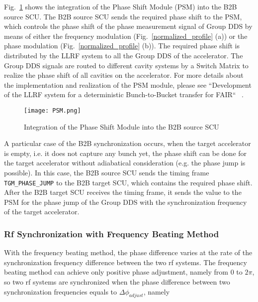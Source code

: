 Fig.~\ref{PSM} shows the integration of the Phase Shift Module (PSM) into the B2B source SCU. The B2B source SCU sends the required phase shift to the \gls{PSM}, which controls the phase shift of the phase measurement signal of Group DDS by means of either the frequency modulation (Fig.~\ref{normalized_profile} (a)) or the phase modulation (Fig.~\ref{normalized_profile} (b)). The required phase shift is distributed by the LLRF system to all the Group DDS of the accelerator. The Group DDS signals are routed to different cavity systems by a Switch Matrix to realize the phase shift of all cavities on the accelerator. For more details about the implementation and realization of the PSM module, please see ``Development of the LLRF system for a deterministic Bunch-to-Bucket transfer for FAIR`` ~\cite{ferrand_development_nodate}.
  \begin{figure}[!htb]
   \centering   
   \texttt{[image: PSM.png]}
   \caption{Integration of the Phase Shift Module into the B2B source SCU}
   \label{PSM}
\end{figure}                     

A particular case of the B2B synchronization occurs, when the target accelerator is empty, i.e. it does not capture any bunch yet, the phase shift can be done for the target accelerator without adiabatical consideration (e.g. the phase jump is possible). In this case, the B2B source SCU sends the timing frame \verb|TGM_PHASE_JUMP| to the B2B target SCU, which contains the required phase shift. After the B2B target SCU receives the timing frame, it sends the value to the PSM for the phase jump of the Group DDS with the synchronization frequency of the target accelerator.

\subsubsection{Rf Synchronization with Frequency Beating Method}

With the frequency beating method, the phase difference varies at the rate of the synchronization frequency difference between the two rf systems. The frequency beating method can achieve only positive phase adjustment, namely from 0 to $2\pi$, so two rf systems are synchronized when the phase difference between two synchronization frequencies equals to $\Delta \phi_\mathit{adjust}$, namely
%
%
%
%

